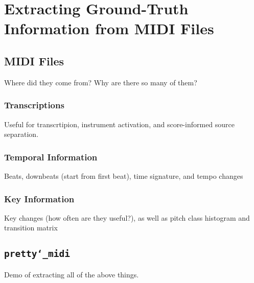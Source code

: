 \chapter{Extracting Ground-Truth Information from MIDI Files}
\label{ch:midi}

\section{MIDI Files}

Where did they come from?
Why are there so many of them?

\subsection{Transcriptions}

Useful for transcrtipion, instrument activation, and score-informed source separation.

\subsection{Temporal Information}

Beats, downbeats (start from first beat), time signature, and tempo changes

\subsection{Key Information}

Key changes (how often are they useful?), as well as pitch class histogram and transition matrix

\section{\texttt{pretty\char`_midi}}

Demo of extracting all of the above things.
